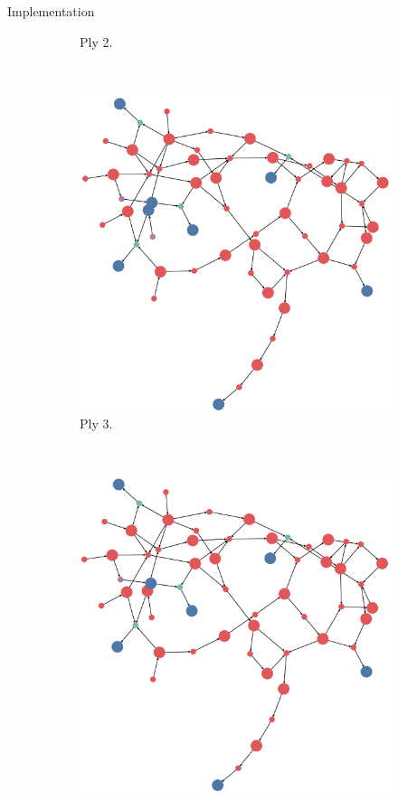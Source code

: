 \documentclass[final]{beamer} %
\begin{document}
\begin{columns}
\begin{column}{.35\textwidth}
\begin{block}{Implementation}
\begin{figure}[!htb]
\begin{subfigure}[!htb]{0.18\columnwidth}
				\caption{Ply 2.}
			\end{subfigure}
			~
			\begin{subfigure}[!htb]{0.18\columnwidth}
				\centering
				\includegraphics[width=\columnwidth]{figures/knn_backward_think_3.png}
				\caption{Ply 3.}
			\end{subfigure}
			~
			\begin{subfigure}[!htb]{0.18\columnwidth}
				\centering
				\includegraphics[width=\columnwidth]{figures/knn_backward_think_4.png}

\end{subfigure}
\end{figure}
\end{block}
\end{column}
\end{columns}
\end{document}
